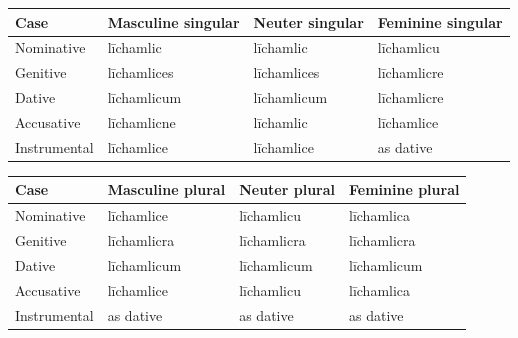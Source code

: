 \par\begingroup
\fontsize{10.5}{13.2}\selectfont
\setlength{\LTleft}{0pt}\setlength{\LTright}{\fill}
\noindent
\begin{tabular}{@{}>{\raggedright\arraybackslash}p{22.0mm}>{\raggedright\arraybackslash}p{31.188mm}>{\raggedright\arraybackslash}p{31.188mm}>{\raggedright\arraybackslash}p{31.188mm}@{}}
\toprule
\textbf{Case} & \textbf{Masculine singular} & \textbf{Neuter singular} & \textbf{Feminine singular} \\
\midrule
Nominative & līchamlic & līchamlic & līchamlicu \\
Genitive & līchamlices & līchamlices & līchamlicre \\
Dative & līchamlicum & līchamlicum & līchamlicre \\
Accusative & līchamlicne & līchamlic & līchamlice \\
Instrumental & līchamlice & līchamlice & as dative \\
\bottomrule
\end{tabular}
\par\endgroup
\par\addvspace{5pt}
\par\begingroup
\fontsize{10.5}{13.2}\selectfont
\setlength{\LTleft}{0pt}\setlength{\LTright}{\fill}
\noindent
\begin{tabular}{@{}>{\raggedright\arraybackslash}p{22.0mm}>{\raggedright\arraybackslash}p{31.188mm}>{\raggedright\arraybackslash}p{31.188mm}>{\raggedright\arraybackslash}p{31.188mm}@{}}
\toprule
\textbf{Case} & \textbf{Masculine plural} & \textbf{Neuter plural} & \textbf{Feminine plural} \\
\midrule
Nominative & līchamlice & līchamlicu & līchamlica \\
Genitive & līchamlicra & līchamlicra & līchamlicra \\
Dative & līchamlicum & līchamlicum & līchamlicum \\
Accusative & līchamlice & līchamlicu & līchamlica \\
Instrumental & as dative & as dative & as dative \\
\bottomrule
\end{tabular}
\par\endgroup

